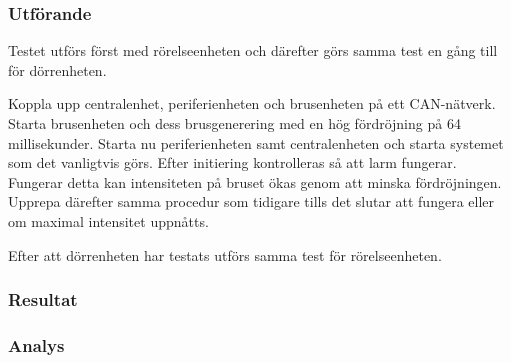 \subsubsection*{Utförande}
Testet utförs först med rörelseenheten och därefter görs samma test en gång till för dörrenheten.

Koppla upp centralenhet, periferienheten och brusenheten på ett CAN-nätverk. Starta brusenheten och dess brusgenerering med en hög fördröjning på 64 millisekunder. Starta nu periferienheten samt centralenheten och starta systemet som det vanligtvis görs. Efter initiering kontrolleras så att larm fungerar. Fungerar detta kan intensiteten på bruset ökas genom att minska fördröjningen. Upprepa därefter samma procedur som tidigare tills det slutar att fungera eller om maximal intensitet uppnåtts.

Efter att dörrenheten har testats utförs samma test för rörelseenheten.


\subsubsection*{Resultat}



\subsubsection*{Analys}



